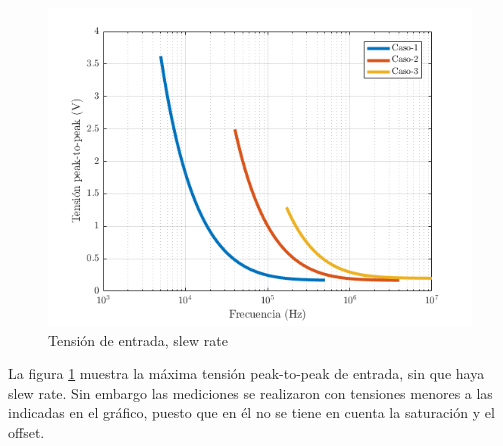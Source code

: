 \documentclass[../../main.tex]{subfiles}
\begin{document}
\begin{figure}[H]
\centering
\includegraphics[width=1\textwidth]{imagenes/slew-rate-n.png}
\caption{Tensi\'on de entrada, slew rate} \label{fig=srn}
\end{figure}

La figura \ref{fig=srn} muestra la máxima tensión peak-to-peak de entrada, sin que haya slew rate. Sin embargo las mediciones se realizaron con tensiones menores a las indicadas en el gráfico, puesto que en él no se tiene en cuenta la saturación  y el offset.
\end{document}
